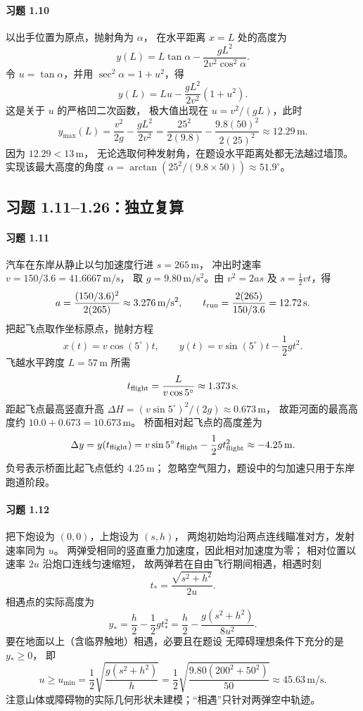 \paragraph{习题 1.10}
以出手位置为原点，抛射角为 \(\alpha\)，
在水平距离 \(x=L\) 处的高度为
\[
 y(L)=L\tan\alpha-\frac{gL^2}{2v^2\cos^2\alpha}.
\]
令 \(u=\tan\alpha\)，并用 \(\sec^2\alpha=1+u^2\)，得
\[
 y(L)=Lu-\frac{gL^2}{2v^2}(1+u^2).
\]
这是关于 \(u\) 的严格凹二次函数，
极大值出现在 \(u=v^2/(gL)\)，此时
\[
 y_{\max}(L)=\frac{v^2}{2g}-\frac{gL^2}{2v^2}
 =\frac{25^2}{2(9.8)}-\frac{9.8(50)^2}{2(25)^2}
 \approx12.29\,\mathrm{m}.
\]
因为 \(12.29<13\,\mathrm{m}\)，
无论选取何种发射角，在题设水平距离处都无法越过墙顶。
实现该最大高度的角度
\(\alpha=\arctan(25^2/(9.8\times50))\approx51.9^\circ\)。


\subsection*{习题 1.11--1.26：独立复算}

\paragraph{习题 1.11}
汽车在东岸从静止以匀加速度行进 \(s=265\,\mathrm m\)，
冲出时速率 \(v=150/3.6=41.6667\,\mathrm{m/s}\)，
取 \(g=9.80\,\mathrm{m/s^2}\)。由
\(v^2=2as\) 及 \(s=\frac12vt\)，得
\[
 a=\frac{(150/3.6)^2}{2(265)}
 \approx3.276\,\mathrm{m/s^2},\qquad
 t_{\rm run}=\frac{2(265)}{150/3.6}=12.72\,\mathrm s.
\]
把起飞点取作坐标原点，抛射方程
\[
 x(t)=v\cos(5^\circ)t,\qquad
 y(t)=v\sin(5^\circ)t-\frac12gt^2.
\]
飞越水平跨度 \(L=57\,\mathrm m\) 所需
\[
 t_{\rm flight}=\frac{L}{v\cos5^\circ}
 \approx1.373\,\mathrm s.
\]
距起飞点最高竖直升高
\(\Delta H=(v\sin5^\circ)^2/(2g)
\approx0.673\,\mathrm m\)，
故距河面的最高高度约
\(10.0+0.673=10.673\,\mathrm m\)。
桥面相对起飞点的高度差为
\[
 \Delta y=y(t_{\rm flight})
 =v\sin5^\circ\,t_{\rm flight}
 -\frac12gt_{\rm flight}^2
 \approx-4.25\,\mathrm m.
\]
负号表示桥面比起飞点低约 \(4.25\,\mathrm m\)；
忽略空气阻力，题设中的匀加速只用于东岸跑道阶段。

\paragraph{习题 1.12}
把下炮设为 \((0,0)\)，上炮设为 \((s,h)\)，
两炮初始均沿两点连线瞄准对方，发射速率同为 \(u\)。
两弹受相同的竖直重力加速度，因此相对加速度为零；
相对位置以速率 \(2u\) 沿炮口连线匀速缩短，
故两弹若在自由飞行期间相遇，相遇时刻
\[
 t_*=\frac{\sqrt{s^2+h^2}}{2u}.
\]
相遇点的实际高度为
\[
 y_*=\frac h2-\frac12gt_*^2
 =\frac h2-\frac{g(s^2+h^2)}{8u^2}.
\]
要在地面以上（含临界触地）相遇，必要且在题设
无障碍理想条件下充分的是 \(y_*\ge0\)，
即
\[
 u\ge u_{\min}
 =\frac12\sqrt{\frac{g(s^2+h^2)}{h}}
 =\frac12\sqrt{\frac{9.80(200^2+50^2)}{50}}
 \approx45.63\,\mathrm{m/s}.
\]
注意山体或障碍物的实际几何形状未建模；“相遇”只针对两弹空中轨迹。

